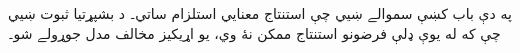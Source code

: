 \documentclass[../../../include/open-logic-chapter]{subfiles}
\begin{document}

\begin{editorial}
  په دې باب کښې سموالے ښيي چې استنتاج معنايي استلزام ساتي۔
  د بشپړتيا ثبوت ښيي چې که له يوې ډلې فرضونو استنتاج ممکن نۀ وي،
  يو اړيکيز مخالف مدل جوړولے شو۔
\end{editorial}


\OLEndChapterHook
\end{document}
